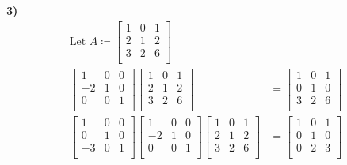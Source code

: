 \documentclass{article}
\begin{document}
\noindent\textbf{3)}
\begin{align*}
    \text{Let }A\coloneqq \begin{bmatrix}
        1 &0  &1   \\
         2&1  &2   \\
         3&2  &6   \\
    \end{bmatrix}\\
    \begin{bmatrix}
        1 &0  &0   \\
         -2&1  &0   \\
         0&0  &1   \\
    \end{bmatrix}\begin{bmatrix}
        1 &0  &1   \\
         2& 1 &2   \\
         3&2  &6   \\
    \end{bmatrix}&=\begin{bmatrix}
        1 &0  &1   \\
         0&1  &0   \\
         3&2  &6   \\
    \end{bmatrix}\\
    \begin{bmatrix}
        1 &0  &0   \\
         0&1  &0   \\
         -3&0  &1   \\
    \end{bmatrix}\begin{bmatrix}
        1 &0  &0   \\
         -2&1  &0   \\
         0&0  &1   \\
    \end{bmatrix}\begin{bmatrix}
        1 &0  &1   \\
         2& 1 &2   \\
         3&2  &6   \\
    \end{bmatrix}&=\begin{bmatrix}
        1 &0  &1   \\
         0&1  &0   \\
         0&2  &3   \\
    \end{bmatrix}\\

\end{align*}
\end{document}
